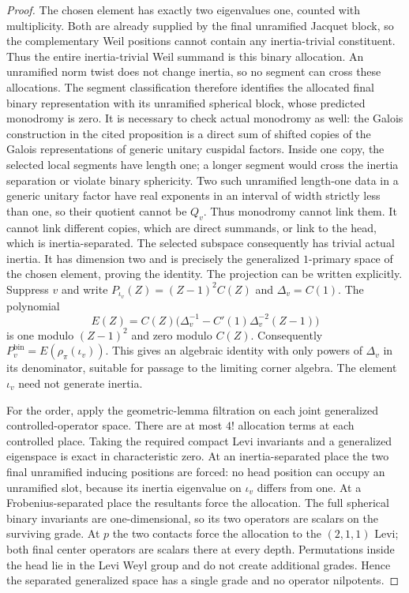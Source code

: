 \begin{proof}
The chosen element has exactly two eigenvalues one, counted
with multiplicity.  Both are already supplied by the final
unramified Jacquet block, so the complementary Weil positions
cannot contain any inertia-trivial constituent.  Thus the
entire inertia-trivial Weil summand is this binary allocation.
An unramified norm twist does not change inertia, so no segment
can cross these allocations.  The segment classification
therefore identifies the allocated final binary representation
with its unramified spherical block, whose predicted monodromy
is zero.  It is necessary to check actual monodromy as well:
the Galois construction in the cited proposition is a direct sum
of shifted copies of the Galois representations of generic
unitary cuspidal factors.  Inside one copy, the selected local
segments have length one; a longer segment would cross the
inertia separation or violate binary sphericity.  Two such
unramified length-one data in a generic unitary factor have real
exponents in an interval of width strictly less than one, so
their quotient cannot be $Q_v$.  Thus monodromy cannot link
them.  It cannot link different copies, which are direct
summands, or link to the head, which is inertia-separated.
The selected subspace consequently has trivial actual inertia.
It has dimension two and is precisely the generalized
$1$-primary space of the chosen element, proving the identity.
The projection can be written explicitly.  Suppress $v$ and
write $P_{\iota_v}(Z)=(Z-1)^2C(Z)$ and $\Delta_v=C(1)$.
The polynomial
\[
 E(Z)=C(Z)\bigl(\Delta_v^{-1}
                  -C'(1)\Delta_v^{-2}(Z-1)\bigr)
\]
is one modulo $(Z-1)^2$ and zero modulo $C(Z)$.
Consequently $P_v^{\mathrm{bin}}=E(\rho_\pi(\iota_v))$.
This gives an algebraic identity with only powers of
$\Delta_v$ in its denominator, suitable for passage to the
limiting corner algebra.  The element $\iota_v$ need not
generate inertia.

For the order, apply the geometric-lemma filtration on each
joint generalized controlled-operator space.  There are at
most $4!$ allocation terms at each controlled place.  Taking
the required compact Levi invariants and a generalized
eigenspace is exact in characteristic zero.  At an
inertia-separated place the two final unramified inducing
positions are forced: no head position can occupy an
unramified slot, because its inertia eigenvalue on
$\iota_v$ differs from one.  At a Frobenius-separated place
the resultants force the allocation.  The full spherical
binary invariants are one-dimensional, so its two operators
are scalars on the surviving grade.  At $p$ the two contacts
force the allocation to the $(2,1,1)$ Levi; both final center
operators are scalars there at every depth.  Permutations
inside the head lie in the Levi Weyl group and do not create
additional grades.  Hence the separated generalized space
has a single grade and no operator nilpotents.


\end{proof}
